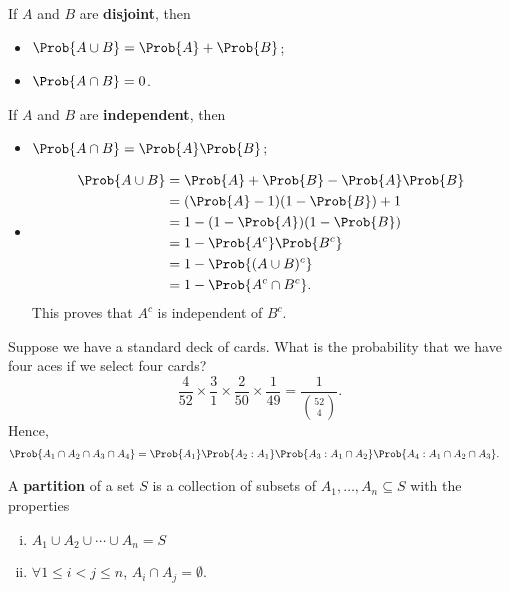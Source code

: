 \begin{Definition}{}{}
    If $ A $ and $ B $ are \textbf{disjoint}, then
    \begin{itemize}
        \item $ \Prob{A\cup B}=\Prob{A}+\Prob{B} $;
        \item $ \Prob{A\cap B}=0 $.
    \end{itemize}
    If $ A $ and $ B $ are \textbf{independent}, then
    \begin{itemize}
        \item $ \Prob{A\cap B}=\Prob{A}\Prob{B} $;
        \item \begin{align*}
                  \Prob{A\cup B}
                   & =\Prob{A}+\Prob{B}-\Prob{A}\Prob{B} \\
                   & =(\Prob{A}-1)(1-\Prob{B})+1         \\
                   & =1-(1-\Prob{A})(1-\Prob{B})         \\
                   & =1-\Prob{A^c}\Prob{B^c}             \\
                   & =1-\Prob{(A\cup B)^c}               \\
                   & =1-\Prob{A^c\cap B^c}.
              \end{align*}
              This proves that $ A^c $ is independent of $ B^c $.
    \end{itemize}
\end{Definition}
\begin{Example}{}{}
    Suppose we have a standard deck of cards. What is the probability
    that we have four aces if we select four cards?
    \[ \frac{4}{52}\times \frac{3}{1}\times \frac{2}{50}\times \frac{1}{49}=
        \frac{1}{\binom{52}{4}}. \]
    Hence,
    \begin{align*}
        \Prob{A_1\cap A_2\cap A_3\cap A_4}
         & =\Prob{A_1}\Prob{A_2\given A_1}\Prob{A_3\given A_1\cap A_2}
        \Prob{A_4\given A_1\cap A_2\cap A_3}.
    \end{align*}
\end{Example}
\begin{Definition}{}{}
    A \textbf{partition} of a set $ S $
    is a collection of subsets
    of $ A_1,\ldots,A_n\subseteq S $ with the properties
    \begin{enumerate}[(i)]
        \item $ A_1\cup A_2\cup \cdots \cup A_n = S $
        \item $ \forall 1\le i<j\le n $, $ A_i\cap A_j=\emptyset $.
    \end{enumerate}
\end{Definition}
